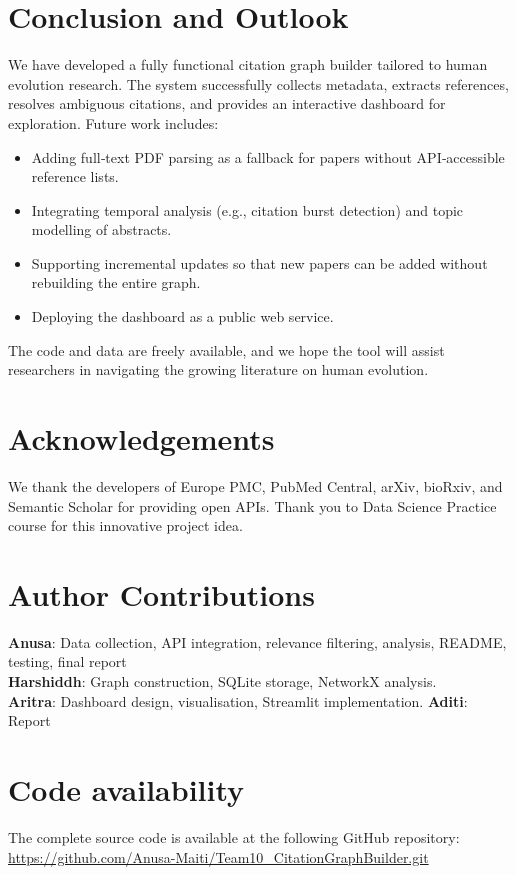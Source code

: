 \section{Conclusion and Outlook}
We have developed a fully functional citation graph builder tailored to human evolution research. The system successfully collects metadata, extracts references, resolves ambiguous citations, and provides an interactive dashboard for exploration. Future work includes:
\begin{itemize}
    \item Adding full‑text PDF parsing as a fallback for papers without API‑accessible reference lists.
    \item Integrating temporal analysis (e.g., citation burst detection) and topic modelling of abstracts.
    \item Supporting incremental updates so that new papers can be added without rebuilding the entire graph.
    \item Deploying the dashboard as a public web service.
\end{itemize}
The code and data are freely available, and we hope the tool will assist researchers in navigating the growing literature on human evolution.

\section{Acknowledgements}
We thank the developers of Europe PMC, PubMed Central, arXiv, bioRxiv, and Semantic Scholar for providing open APIs. Thank you to Data Science Practice course for this innovative project idea.

\section{Author Contributions}
\textbf{Anusa}: Data collection, API integration, relevance filtering, analysis, README, testing, final report\\
\textbf{Harshiddh}: Graph construction, SQLite storage, NetworkX analysis. \\
\textbf{Aritra}: Dashboard design, visualisation, Streamlit implementation.
\textbf{Aditi}: Report\\

\section{Code availability}
The complete source code is available at the following GitHub repository: \\
\url{https://github.com/Anusa-Maiti/Team10_CitationGraphBuilder.git}

